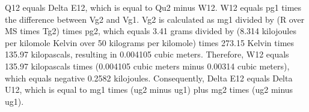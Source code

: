 Q12 equals Delta E12, which is equal to Qu2 minus W12. W12 equals pg1 times the difference between Vg2 and Vg1. Vg2 is calculated as mg1 divided by (R over MS times Tg2) times pg2, which equals 3.41 grams divided by (8.314 kilojoules per kilomole Kelvin over 50 kilograms per kilomole) times 273.15 Kelvin times 135.97 kilopascals, resulting in 0.004105 cubic meters. Therefore, W12 equals 135.97 kilopascals times (0.004105 cubic meters minus 0.00314 cubic meters), which equals negative 0.2582 kilojoules. Consequently, Delta E12 equals Delta U12, which is equal to mg1 times (ug2 minus ug1) plus mg2 times (ug2 minus ug1).